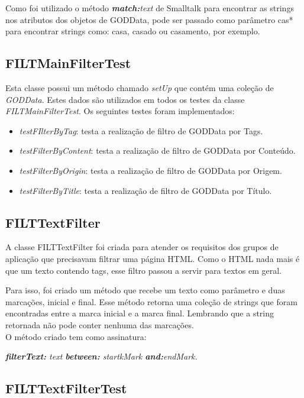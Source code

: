 Como foi utilizado o método \textit{\textbf{match:}text} de Smalltalk para encontrar as strings nos atributos dos objetos de GODData, pode ser passado como parâmetro cas* para encontrar strings como: casa, casado ou casamento, por exemplo. 

\subsection{FILTMainFilterTest}

Esta classe possui um método chamado \textit{setUp} que contém uma coleção de \textit{GODData}. Estes dados são utilizados em todos os testes da classe \textit{FILTMainFilterTest}. Os seguintes testes foram implementados:

\begin{itemize}
\item \textit{testFIlterByTag}: testa a realização de filtro de GODData por Tags. 
\item \textit{testFilterByContent}: testa a realização de filtro de GODData por Conteúdo. 
\item \textit{testFilterByOrigin}: testa a realização de filtro de GODData por Origem. 
\item \textit{testFilterByTitle}: testa a realização de filtro de GODData por Título. 
\end{itemize}

\subsection{FILTTextFilter}

A classe FILTTextFilter foi criada para atender os requisitos dos grupos de aplicação que precisavam filtrar uma página HTML. Como o HTML nada mais é que um texto contendo tags, esse filtro passou a servir para textos em geral.

Para isso, foi criado um método que recebe um texto como parâmetro e duas marcações, inicial e final. Esse método retorna uma coleção de strings que foram encontradas entre a marca inicial e a marca final. Lembrando que a string retornada não pode conter nenhuma das marcações.\\

O método criado tem como assinatura: 

\textit{\textbf{filterText:} text \textbf{between:} startkMark \textbf{and:}endMark.}

\subsection{FILTTextFilterTest}

